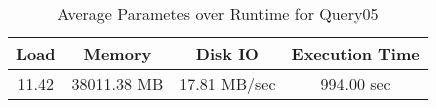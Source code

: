 \documentclass[../../main.tex]{subfiles}
\begin{document}
    \begin{table}
        \begin{center}
            \begin{tabular}{ |c|c|c|c| } 
            \hline
            Load & Memory & Disk IO & Execution Time\\
            \hline
            11.42 & 38011.38 MB & 17.81 MB/sec & 994.00 sec \\
            \hline
            \end{tabular}
            \\[1pt]
            \caption{Average Parametes over Runtime for Query05}
        \end{center}
    \end{table}
    \pagebreak
\end{document}
